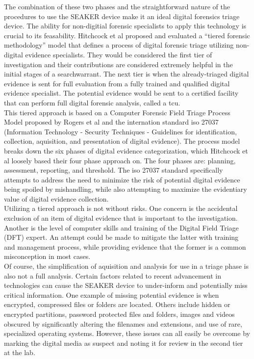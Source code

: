 \documentclass[12pt]{article}
\begin{document}
The combination of these two phases and the straightforward nature of the procedures to use
the SEAKER device make it an ideal digital forensics triage device.  The ability for
non-digitial forensic specialists to apply this technology is crucial to its feasability.
Hitchcock et al\cite{hitchcock2016tiered} proposed and evaluated a ``tiered forensic
methodology'' model that defines a process of digital forensic triage utilizing non-digital
evidence specialists.  They would be considered the first tier of investigation and their
contributions are considered extremely helpful in the initial stages of a \gls{searchwarrant}.
The next tier is when the already-triaged digital evidence is sent for full evaluation from
a fully trained and qualified digital evidence specialist.
The potential evidence would be sent to a certified facility that can perform full digital
forensic analysis, called a \gls{tcu}.\\

This tiered approach is based on a Computer Forensic Field Triage Process Model proposed
by Rogers et al \cite{rogers2006computer} and the internation standard \gls{iso} 27037
(Information Technology - Security Techniques - Guidelines for identification, collection,
aquisition, and presentation of digital evidence). The process model breaks down the six
phases of digital evidence categorization, which Hitchcock et al\cite{hitchcock2016tiered}
loosely based their four phase approach on.  The four phases are: planning, assessment,
reporting, and threshold.  The \gls{iso} 27037 standard specifically attempts to address the need
to minimize the risk of potential digital evidence being spoiled by mishandling, while also
attempting to maximize the evidentiary value of digital evidence collection.\\

Utilizing a tiered approach is not without risks.  One concern is the accidental exclusion
of an item of digital evidence that is important to the investigation.  Another is the
level of computer skills and training of the Digital Field Triage (DFT) expert.  An attempt
could be made to mitigate the latter with training and management process, while providing
evidence that the former is a common misconception in most cases\cite{rogers2006computer}.\\

Of course, the simplification of aquisition and analysis for use in a triage phase is also
not a full analysis. Certain factors related to recent advancement in technologies can cause
the SEAKER device to under-inform and potentially miss critical information.  One
example of missing potential evidence is when encrypted, compressed files or folders
are located\cite{shaw2013practical}.  Others include hidden or encrypted partitions,
password protected files and folders, images and videos obscured by significantly altering
the filenames and extensions, and use of rare, specialized operating systems. However,
these issues can all easily be overcome by marking the digital media as suspect and noting
it for review in the second tier at the lab.\\
\end{document}
